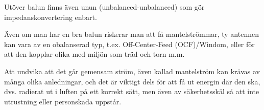 Utöver balun finns även unun (unbalanced-unbalanced) som gör
impedanskonvertering enbart.

Även om man har en bra balun riskerar man att få mantelströmmar, ty antennen
kan vara av en obalanserad typ, t.ex. Off-Center-Feed (OCF)/Windom, eller
för att den kopplar olika med miljön som träd och torn m.m.

Att undvika att det går gemensam ström, även kallad mantelström kan krävas av
många olika anledningar, och det är viktigt dels för att få ut energin där den
ska, dvs. radierat ut i luften på ett korrekt sätt, men även av säkerhetsskäl
så att inte utrustning eller personskada uppstår.
